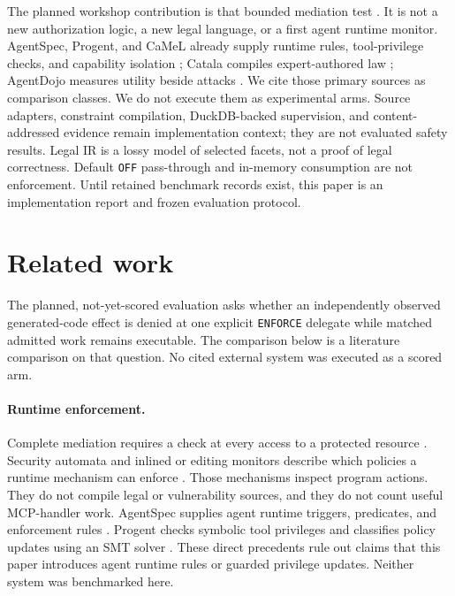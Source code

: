 \documentclass{article}
\begin{document}
The planned workshop contribution is that bounded mediation test \citep{vericode2026cfp}. It is not a new authorization logic, a new legal language, or a first agent runtime monitor. AgentSpec, Progent, and CaMeL already supply runtime rules, tool-privilege checks, and capability isolation \citep{wang2025agentspec,shi2025progent,debenedetti2025camel}; Catala compiles expert-authored law \citep{catala}; AgentDojo measures utility beside attacks \citep{debenedetti2024agentdojo}. We cite those primary sources as comparison classes. We do not execute them as experimental arms. Source adapters, constraint compilation, DuckDB-backed supervision, and content-addressed evidence remain implementation context; they are not evaluated safety results. Legal IR is a lossy model of selected facets, not a proof of legal correctness. Default \texttt{OFF} pass-through and in-memory consumption are not enforcement. Until retained benchmark records exist, this paper is an implementation report and frozen evaluation protocol.

\section{Related work}
\label{sec:related}

The planned, not-yet-scored evaluation asks whether an independently observed generated-code effect is denied at one explicit \texttt{ENFORCE} delegate while matched admitted work remains executable. The comparison below is a literature comparison on that question. No cited external system was executed as a scored arm.

\paragraph{Runtime enforcement.}
Complete mediation requires a check at every access to a protected resource \citep{saltzer1975protection}. Security automata and inlined or editing monitors describe which policies a runtime mechanism can enforce \citep{schneider2000enforceable,erlingsson2000irm,ligatti2005edit,hamlen2006enforcement}. Those mechanisms inspect program actions. They do not compile legal or vulnerability sources, and they do not count useful MCP-handler work. AgentSpec supplies agent runtime triggers, predicates, and enforcement rules \citep{wang2025agentspec}. Progent checks symbolic tool privileges and classifies policy updates using an SMT solver \citep{shi2025progent}. These direct precedents rule out claims that this paper introduces agent runtime rules or guarded privilege updates. Neither system was benchmarked here.
\end{document}
